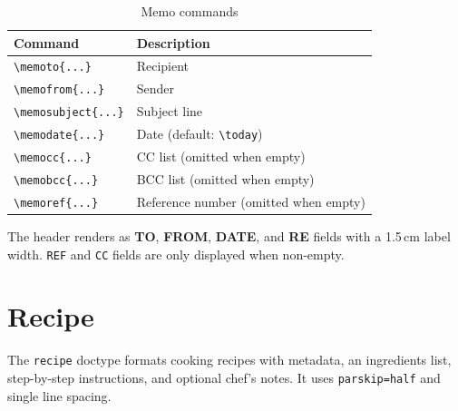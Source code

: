 \begin{table}[htbp]
    \centering
    \caption{Memo commands}
    \label{tab:memo-commands}
    \begin{tabular}{@{} l p{7.5cm} @{}}
        \toprule
        \textbf{Command} & \textbf{Description} \\
        \midrule
        \texttt{\textbackslash memoto\{...\}}      & Recipient \\
        \texttt{\textbackslash memofrom\{...\}}    & Sender \\
        \texttt{\textbackslash memosubject\{...\}} & Subject line \\
        \texttt{\textbackslash memodate\{...\}}    & Date (default: \texttt{\textbackslash today}) \\
        \texttt{\textbackslash memocc\{...\}}      & CC list (omitted when empty) \\
        \texttt{\textbackslash memobcc\{...\}}     & BCC list (omitted when empty) \\
        \texttt{\textbackslash memoref\{...\}}     & Reference number (omitted when empty) \\
        \bottomrule
    \end{tabular}
\end{table}

The header renders as \textbf{TO}, \textbf{FROM}, \textbf{DATE}, and
\textbf{RE} fields with a 1.5\,cm label width.  \texttt{REF} and
\texttt{CC} fields are only displayed when non-empty.

\section{Recipe}
\label{sec:recipe}

The \texttt{recipe} doctype formats cooking recipes with metadata, an
ingredients list, step-by-step instructions, and optional chef's notes.
It uses \texttt{parskip=half} and single line spacing.

